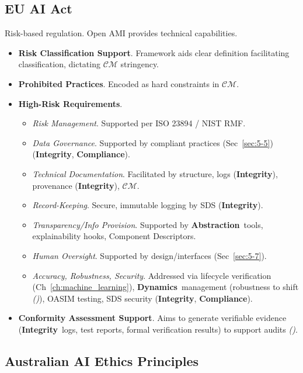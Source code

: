 \documentclass[12pt,a4paper]{report}
\renewcommand{\citep}[1]{\textit{\scriptsize{(\cite{#1})}}}
\newcommand{\Integrity}{\textbf{Integrity}}
\newcommand{\Abstraction}{\textbf{Abstraction}}
\newcommand{\Dynamics}{\textbf{Dynamics}}
\begin{document}
	\subsection{EU AI Act}
	\label{app:compmap_eu_ai_act}
	
	Risk-based regulation. Open AMI provides technical capabilities.
	
	\begin{itemize}
		\item \textbf{Risk Classification Support}. Framework aids clear definition facilitating classification, dictating $\mathcal{CM}$ stringency.
		\item \textbf{Prohibited Practices}. Encoded as hard constraints in $\mathcal{CM}$.
		\item \textbf{High-Risk Requirements}.
		\begin{itemize}
			\item \textit{Risk Management}. Supported per ISO 23894 / NIST RMF.
			\item \textit{Data Governance}. Supported by compliant practices (Sec~\ref{sec:5-5}) (\Integrity, \textbf{Compliance}).
			\item \textit{Technical Documentation}. Facilitated by structure, logs (\Integrity), provenance (\Integrity), $\mathcal{CM}$.
			\item \textit{Record-Keeping}. Secure, immutable logging by SDS (\Integrity).
			\item \textit{Transparency/Info Provision}. Supported by \Abstraction\ tools, explainability hooks, Component Descriptors.
			\item \textit{Human Oversight}. Supported by design/interfaces (Sec~\ref{sec:5-7}).
			\item \textit{Accuracy, Robustness, Security}. Addressed via lifecycle verification (Ch~\ref{ch:machine_learning}), \Dynamics\ management (robustness to shift \citep{AdditionalCitationRef53}), OASIM testing, SDS security (\Integrity, \textbf{Compliance}).
		\end{itemize}
		\item \textbf{Conformity Assessment Support}. Aims to generate verifiable evidence (\Integrity\ logs, test reports, formal verification results) to support audits \citep{Navigating_AI_Conformity_2025}.
	\end{itemize}
	
	\subsection{Australian AI Ethics Principles}
	\label{app:compmap_aus_ai_ethics}
	
\end{document}
